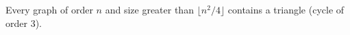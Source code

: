 \documentclass[12pt]{article}
\begin{document}
Every graph of order $n$ and size greater than $\lfloor n^2/4 \rfloor$ contains a triangle (cycle of order 3).
\end{document}
